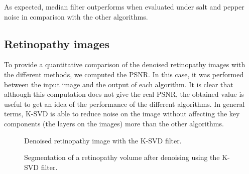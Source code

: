 As expected, median filter outperforms when evaluated under salt and pepper noise in comparison with the other algorithms. 


\subsection{Retinopathy images} 
To provide a quantitative comparison of the denoised retinopathy images with the different methods, we computed the PSNR. In this case, it was performed between the input image and the output of each algorithm. It is clear that although this computation does not give the real PSNR, the obtained value is useful to get an idea of the performance of the different algorithms. In general terms, K-SVD is able to reduce noise on the image without affecting the key components (the layers on the images) more than the other algorithms.

\begin{figure}[H]
  \centering
  \caption{Denoised retinopathy image with the K-SVD filter.} 
  \label{fig:results_rimage_ksvd}
\end{figure}

\begin{figure}[H]
  \centering
  \caption{Segmentation of a retinopathy volume after denoising using the K-SVD filter.} 
  \label{fig:results_rsegmentation_ksvd}
\end{figure}
